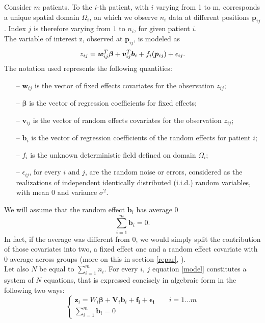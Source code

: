 Consider $m$ patients. To the $i$-th patient, with $i$ varying from 1 to m,
corresponds a unique spatial domain $\Omega_i$, on which we observe $n_i$ data
at different positions $\bm{p}_{ij}$. Index $j$ is therefore varying from $1$
to $n_i$, for given patient $i$.\\The variable of interest z, observed at
$\bm{p}_{ij}$, is modeled as
\begin{equation}
	\label{model}
	z_{ij} = \bm{w}^T_{ij} \bm{\beta} + \bm{v}^T_{ij} \bm{b}_i + f_i(\bm{p_}{ij}) + \epsilon_{ij}.
\end{equation}
The notation used represents the following quantities:
\begin{itemize}
	\item[--] $\bm{w}_{ij}$ is the vector of fixed effects covariates for the
		observation $z_{ij}$; \item[--] $\bm{\beta}$ is the vector of regression
		coefficients for fixed effects; \item[--] $\bm{v}_{ij}$ is the vector of random
		effects covariates for the observation $z_{ij}$; \item[--] $\bm{b}_i$ is the
		vector of regression coefficients of the random effects for patient $i$;
	\item[--] $f_i$ is the unknown deterministic field defined on domain
		$\Omega_i$; \item[--] $\epsilon_{ij}$, for every $i$ and $j$, are the random
		noise or errors, considered as the realizations of independent identically
		distributed (i.i.d.) random variables, with mean $0$ and variance $\sigma^2$.
\end{itemize}
We will assume that the random effect $\bm{b}_i$ has average $0$
\begin{equation}
	\label{constraint}
	\sum_{i=1}^{m}{\bm{b}_i}=0.
\end{equation}
In fact, if the average was different from 0, we would simply split
the contribution of those covariates into two, a fixed effect one and a random
effect covariate with 0 average across groups (more on this in section
\ref{repar}, ). \\ Let also $N$ be equal to $\sum_{i=1}^{m}n_i$.
For every $i$, $j$ equation \ref{model} constitutes a system of $N$ equations,
that is expressed concisely in algebraic form in the following two ways:
\begin{equation}
	\begin{cases}
		\bm{z}_i = W_i \bm{\beta} + \bm{V}_i \bm{b}_i + \bm{f_i} + \bm{\epsilon_i} \qquad
		i=1\dots m \\
		\sum_{i=1}^{m}{\bm{b}_i}=0
	\end{cases}
\end{equation}
